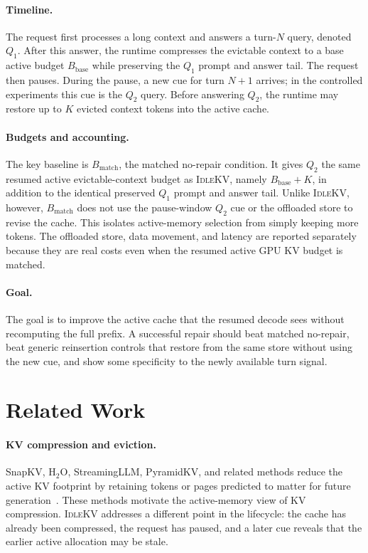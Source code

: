 \documentclass{article}
\newcommand{\idlekv}{\textsc{IdleKV}}
\newcommand{\bbase}{\ensuremath{B_{\mathrm{base}}}}
\newcommand{\bmatch}{\ensuremath{B_{\mathrm{match}}}}
\begin{document}
\paragraph{Timeline.}
The request first processes a long context and answers a turn-$N$ query,
denoted $Q_1$.
After this answer, the runtime compresses the evictable context to a
base active budget $\bbase$ while preserving the $Q_1$ prompt and answer
tail.
The request then pauses.
During the pause, a new cue for turn $N+1$ arrives; in the controlled
experiments this cue is the $Q_2$ query.
Before answering $Q_2$, the runtime may restore up to $K$ evicted
context tokens into the active cache.

\paragraph{Budgets and accounting.}
The key baseline is $\bmatch$, the matched no-repair condition.
It gives $Q_2$ the same resumed active evictable-context budget as
\idlekv{}, namely $\bbase + K$, in addition to the identical preserved
$Q_1$ prompt and answer tail.
Unlike \idlekv{}, however, $\bmatch$ does not use the pause-window
$Q_2$ cue or the offloaded store to revise the cache.
This isolates active-memory selection from simply keeping more tokens.
The offloaded store, data movement, and latency are reported separately
because they are real costs even when the resumed active GPU KV budget is
matched.

\paragraph{Goal.}
The goal is to improve the active cache that the resumed decode sees
without recomputing the full prefix.
A successful repair should beat matched no-repair, beat generic
reinsertion controls that restore from the same store without using the
new cue, and show some specificity to the newly available turn signal.

\section{Related Work}
\label{sec:related}

\paragraph{KV compression and eviction.}
SnapKV, H$_2$O, StreamingLLM, PyramidKV, and related methods reduce the
active KV footprint by retaining tokens or pages predicted to matter for
future generation~\citep{snapkv,h2o,streamingllm,pyramidkv}.
These methods motivate the active-memory view of KV compression.
\idlekv{} addresses a different point in the lifecycle: the cache has
already been compressed, the request has paused, and a later cue reveals
that the earlier active allocation may be stale.
\end{document}
